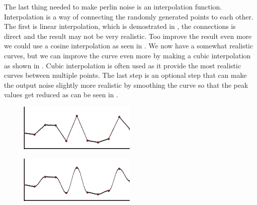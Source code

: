 The last thing needed to make perlin noise is an interpolation function. Interpolation is a way of connecting the randomly generated points to each other. The first is linear interpolation, which is demostrated in , the connections is direct and the result may not be very realistic. Too improve the result even more we could use a cosine interpolation as seen in . We now have a somewhat realistic curves, but we can improve the curve even more by making a cubic interpolation as shown in . Cubic interpolation is often used as it provide the most realistic curves between multiple points. The last step is an optional step that can make the output noise slightly more realistic by smoothing the curve so that the peak values get reduced as can be seen in .


\begin{figure}[H]
	\begin{minipage}[b]{.5\linewidth}
		\includegraphics[width=0.95\linewidth]{img/m_inter1}
		\label{fig:1a}
	\end{minipage}
	\begin{minipage}[b]{.5\linewidth}
		\includegraphics[width=0.95\linewidth]{img/m_inter2}
		\label{fig:1b}

\end{minipage}
\end{figure}
